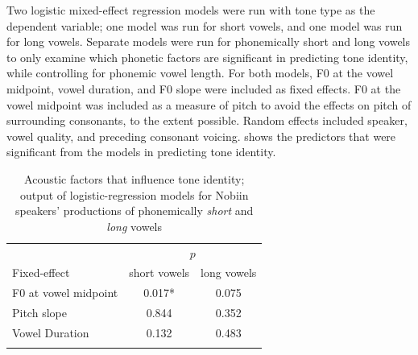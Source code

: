 \documentclass[output=paper]{langscibook}
\begin{document}
Two logistic mixed-effect regression models were run with tone type as the dependent variable; one model was run for short vowels, and one model was run for long vowels. Separate models were run for phonemically short and long vowels to only examine which phonetic factors are significant in predicting tone identity, while controlling for phonemic vowel length. For both models, F0 at the vowel midpoint, vowel duration, and F0 slope were included as fixed effects. F0 at the vowel midpoint was included as a measure of pitch to avoid the effects on pitch of surrounding consonants, to the extent possible. Random effects included speaker, vowel quality, and preceding consonant voicing.  shows the predictors that were significant from the models in predicting tone identity.

\begin{table}
\caption{Acoustic factors that influence tone identity; output of logistic-regression models for Nobiin speakers' productions of phonemically \textit{short} and \textit{long} vowels\label{tab:oakley:shortvowelmodel}\label{tab:oakley:longvowelmodel}}
\begin{tabular}{l S[table-format=1.3] S[table-format=1.3]}
 \lsptoprule
               &  \\\cmidrule(lr){2-3}
 Fixed-effect  & {short vowels} & {long vowels}\\\midrule
F0 at vowel midpoint & 0.017* & 0.075  \\ 
Pitch slope & 0.844           & 0.352  \\ 
Vowel Duration & 0.132        & 0.483  \\ 
\lspbottomrule
\end{tabular}
\end{table}

\end{document}
